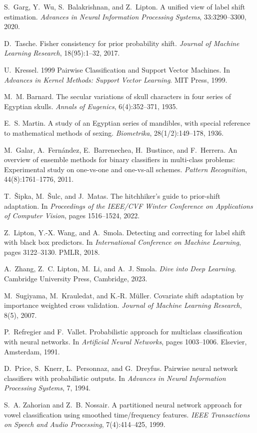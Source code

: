 \documentclass[preprint,12pt]{elsarticle}
\theoremstyle{thmstyleone}%
\theoremstyle{thmstyletwo}%
\theoremstyle{thmstylethree}%
\begin{document}
\begin{thebibliography}{00}
S.~Garg, Y.~Wu, S.~Balakrishnan, and Z.~Lipton.
A unified view of label shift estimation.
\emph{Advances in Neural Information Processing Systems}, 33:3290--3300, 2020.

D.~Tasche.
Fisher consistency for prior probability shift.
\emph{Journal of Machine Learning Research}, 18(95):1--32, 2017.

U.~Kressel.
1999 Pairwise Classification and Support Vector Machines.
In \emph{Advances in Kernel Methods: Support Vector Learning}. MIT Press, 1999.

M.~M. Barnard.
The secular variations of skull characters in four series of Egyptian skulls.
\emph{Annals of Eugenics}, 6(4):352--371, 1935.

E.~S. Martin.
A study of an Egyptian series of mandibles, with special reference to mathematical methods of sexing.
\emph{Biometrika}, 28(1/2):149--178, 1936.

M.~Galar, A.~Fern{\'a}ndez, E.~Barrenechea, H.~Bustince, and F.~Herrera.
An overview of ensemble methods for binary classifiers in multi-class problems: Experimental study on one-vs-one and one-vs-all schemes.
\emph{Pattern Recognition}, 44(8):1761--1776, 2011.

T.~{\v{S}}ipka, M.~{\v{S}}ulc, and J.~Matas.
The hitchhiker's guide to prior-shift adaptation.
In \emph{Proceedings of the IEEE/CVF Winter Conference on Applications of Computer Vision}, pages 1516--1524, 2022.

Z.~Lipton, Y.-X. Wang, and A.~Smola.
Detecting and correcting for label shift with black box predictors.
In \emph{International Conference on Machine Learning}, pages 3122--3130. PMLR, 2018.

A.~Zhang, Z.~C. Lipton, M.~Li, and A.~J. Smola.
\emph{Dive into Deep Learning}.
Cambridge University Press, Cambridge, 2023.

M.~Sugiyama, M.~Krauledat, and K.-R. M{\"u}ller.
Covariate shift adaptation by importance weighted cross validation.
\emph{Journal of Machine Learning Research}, 8(5), 2007.

P.~Refregier and F.~Vallet.
Probabilistic approach for multiclass classification with neural networks.
In \emph{Artificial Neural Networks}, pages 1003--1006. Elsevier, Amsterdam, 1991.

D.~Price, S.~Knerr, L.~Personnaz, and G.~Dreyfus.
Pairwise neural network classifiers with probabilistic outputs.
In \emph{Advances in Neural Information Processing Systems}, 7, 1994.

S.~A. Zahorian and Z.~B. Nossair.
A partitioned neural network approach for vowel classification using smoothed time/frequency features.
\emph{IEEE Transactions on Speech and Audio Processing}, 7(4):414--425, 1999.

\end{thebibliography}
\end{document}
